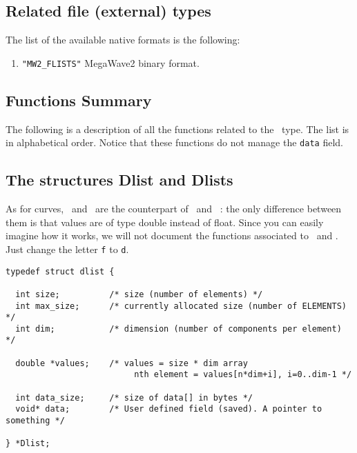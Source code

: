 \subsection{Related file (external) types}
\label{curves-polygons_flists-file_type}

The list of the available native formats is the following:
\begin{enumerate}
\item \verb+"MW2_FLISTS"+ MegaWave2 binary format.
\end{enumerate}


\subsection{Functions Summary}
\label{curves-polygons_flists_function}

The following is a description of all the functions related to 
the \flists\ type. The list is in alphabetical order.
Notice that these functions do not manage the \verb+data+ field.

\newpage %



\subsection{The structures Dlist and Dlists}
\label{curves-polygons_dlist-dlists}

As for curves, \dlist{}\ and \dlists{}\ are the counterpart 
of \flist\ and \flists\ :
the only difference between them is that values are of type double instead of float.
Since you can easily imagine how it works, we will not document the functions
associated to \dlist\ and \dlists. Just change the letter \verb+f+ to \verb+d+.


{\small
\begin{verbatim}
typedef struct dlist {

  int size;          /* size (number of elements) */
  int max_size;      /* currently allocated size (number of ELEMENTS) */
  int dim;           /* dimension (number of components per element) */

  double *values;    /* values = size * dim array
                          nth element = values[n*dim+i], i=0..dim-1 */

  int data_size;     /* size of data[] in bytes */
  void* data;        /* User defined field (saved). A pointer to something */

} *Dlist;
\end{verbatim}
}

